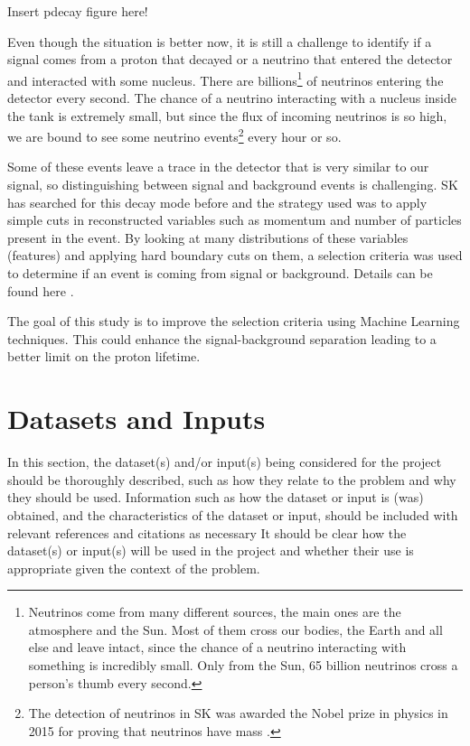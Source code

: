 \documentclass[11pt, oneside]{article}   	%
\begin{document}
Insert pdecay figure here!

Even though the situation is better now, it is still a challenge to identify if a signal comes from a proton that decayed or a neutrino that entered the detector and interacted with some nucleus. There are billions\footnote{Neutrinos come from many different sources, the main ones are the atmosphere and the Sun. Most of them cross our bodies, the Earth and all else and leave intact, since the chance of a neutrino interacting with something is incredibly small. Only from the Sun, 65 billion neutrinos cross a  person's thumb every second.} of neutrinos entering the detector every second. The chance of a neutrino interacting with a nucleus inside the tank is extremely small, but since the flux of incoming neutrinos is so high, we are bound to see some neutrino events\footnote{The detection of neutrinos in SK was awarded the Nobel prize in physics in 2015 for proving that neutrinos have mass \cite{Nobel}.} every hour or so.

Some of these events leave a trace in the detector that is very similar to our signal, so distinguishing between signal and background events is challenging. SK has searched for this decay mode before and the strategy used was to apply simple cuts in reconstructed variables such as momentum and number of particles present in the event. By looking at many distributions of these variables (features) and applying hard boundary cuts on them, a selection criteria was used to determine if an event is coming from signal or background. Details can be found here \cite{Miura}.

The goal of this study is to improve the selection criteria using Machine Learning techniques. This could enhance the signal-background separation leading to a better limit on the proton lifetime.

\section{Datasets and Inputs}

In this section, the dataset(s) and/or input(s) being considered for the project should be thoroughly described, such as how they relate to the problem and why they should be used. Information such as how the dataset or input is (was) obtained, and the characteristics of the dataset or input, should be included with relevant references and citations as necessary It should be clear how the dataset(s) or input(s) will be used in the project and whether their use is appropriate given the context of the problem.
\end{document}
